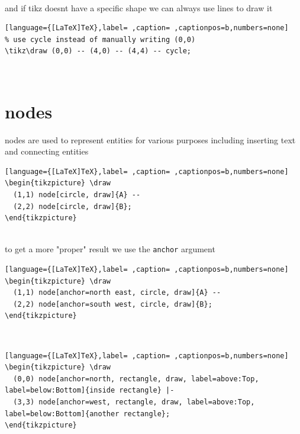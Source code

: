 \documentclass[a4paper,12pt]{article}
\begin{document}
\\[0pt]

and if tikz doesnt have a specific shape we can always use lines to draw it\\[0pt]

\begin{lstlisting}[language={[LaTeX]TeX},label= ,caption= ,captionpos=b,numbers=none]
% use cycle instead of manually writing (0,0)
\tikz\draw (0,0) -- (4,0) -- (4,4) -- cycle;
\end{lstlisting}

\\[0pt]

\section{nodes}
\label{sec:orgf91e73d}
nodes are used  to represent entities for various purposes including inserting text and connecting entities\\[0pt]
\begin{lstlisting}[language={[LaTeX]TeX},label= ,caption= ,captionpos=b,numbers=none]
\begin{tikzpicture} \draw
  (1,1) node[circle, draw]{A} --
  (2,2) node[circle, draw]{B};
\end{tikzpicture}
\end{lstlisting}

\\[0pt]

to get a more "proper" result we use the \texttt{anchor} argument\\[0pt]

\begin{lstlisting}[language={[LaTeX]TeX},label= ,caption= ,captionpos=b,numbers=none]
\begin{tikzpicture} \draw
  (1,1) node[anchor=north east, circle, draw]{A} --
  (2,2) node[anchor=south west, circle, draw]{B};
\end{tikzpicture}
\end{lstlisting}

\\[0pt]

\begin{lstlisting}[language={[LaTeX]TeX},label= ,caption= ,captionpos=b,numbers=none]
\begin{tikzpicture} \draw
  (0,0) node[anchor=north, rectangle, draw, label=above:Top, label=below:Bottom]{inside rectangle} |-
  (3,3) node[anchor=west, rectangle, draw, label=above:Top, label=below:Bottom]{another rectangle};
\end{tikzpicture}
\end{lstlisting}
\end{document}
